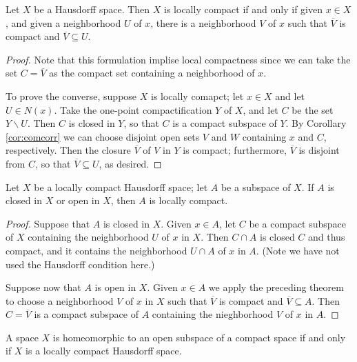 \documentclass[12pt, a4paper, oneside, openright, titlepage]{book}
\begin{document}
\begin{thm}
    Let $X$ be a Hausdorff space. Then $X$ is locally compact if and only if given $x \in X$, and given a neighborhood $U$ of $x$, there is a neighborhood $V$ of $x$ such that $\overline{V}$ is compact and $\overline{V} \subseteq U$.
\end{thm}
\begin{proof}
    Note that this formulation implise local compactness since we can take the set $C = \overline{V}$ as the compact set containing a neighborhood of $x$.

    To prove the converse, suppose $X$ is locally comapct; let $x \in X$ and let $U \in N(x)$. Take the one-point compactification $Y$ of $X$, and let $C$ be the set $Y \backslash U$. Then $C$ is closed in $Y$, so that $C$ is a compact subspace of $Y$. By Corollary \ref{cor:comcorr} we can choose disjoint open sets $V$ and $W$ containing $x$ and $C$, respectively. Then the closure $\overline{V}$ of $V$ in $Y$ is compact; furthermore, $\overline{V}$ is disjoint from $C$, so that $\overline{V} \subseteq U$, as desired.
\end{proof}

\begin{cor}
    Let $X$ be a locally compact Hausdorff space; let $A$ be a subspace of $X$. If $A$ is closed in $X$ or open in $X$, then $A$ is locally compact.
\end{cor}
\begin{proof}
    Suppose that $A$ is closed in $X$. Given $x \in A$, let $C$ be a compact subspace of $X$ containing the neighborhood $U$ of $x$ in $X$. Then $C\cap A$ is closed $C$ and thus compact, and it contains the neighborhood $U\cap A$ of $x$ in $A$. (Note we have not used the Hausdorff condition here.)

    Suppose now that $A$ is open in $X$. Given $x \in A$ we apply the preceding theorem to choose a neighborhood $V$ of $x$ in $X$ such that $\overline{V}$ is compact and $\overline{V} \subseteq A$. Then $C = \overline{V}$ is a compact subspace of $A$ containing the nieghborhood $V$ of $x$ in $A$.
\end{proof}

\begin{cor}
    A space $X$ is homeomorphic to an open subspace of a compact space if and only if $X$ is a locally compact Hausdorff space.
\end{cor}






\end{document}

